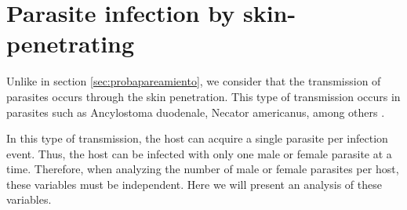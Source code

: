\documentclass[12pt,a4paper]{article}
\theoremstyle{plain}%
\theoremstyle{definition}
\theoremstyle{remark}
\begin{document}


		
\section{Parasite infection by skin-penetrating}%
\label{sec:disindep}

Unlike in section \ref{sec:probapareamiento}, we consider that the transmission of parasites occurs through the skin penetration. This type of transmission occurs in parasites such as Ancylostoma duodenale, Necator americanus, among others \cite{bryant2018critical,castelletto2014diverse}. 

In this type of transmission, the host can acquire a single parasite per infection event. Thus, the host can be infected with only one male or female parasite at a time. Therefore, when analyzing the number of male or female parasites per host, these variables must be independent. Here we will present an analysis of these variables.

	
	
\end{document}
